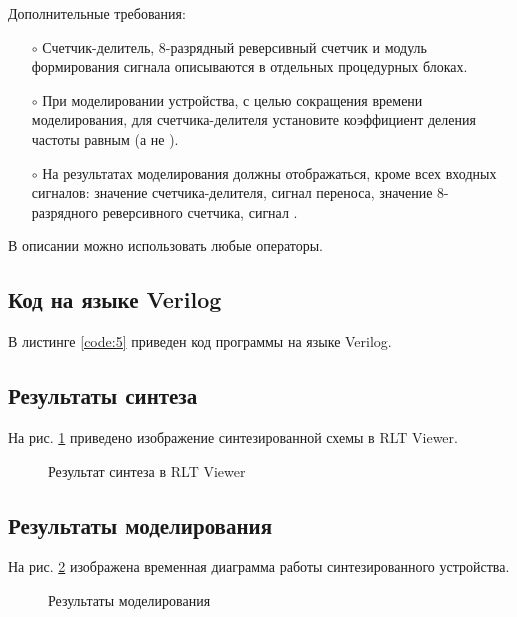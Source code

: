 Дополнительные требования:
\begin{itemize}
	\item[$\circ$] Счетчик-делитель, 8-разрядный реверсивный счетчик и модуль формирования сигнала  описываются в отдельных процедурных блоках.
	\item[$\circ$] При моделировании устройства, с целью сокращения времени моделирования, для счетчика-делителя установите коэффициент деления частоты равным  (а не ).
	\item[$\circ$] На результатах моделирования должны отображаться, кроме всех входных сигналов: значение счетчика-делителя, сигнал переноса, значение 8-разрядного реверсивного счетчика, сигнал .
\end{itemize}

В описании можно использовать любые операторы.

\subsection{Код на языке Verilog}

В листинге \ref{code:5} приведен код программы на языке Verilog.

%

\subsection{Результаты синтеза}

На рис. \ref{fig:elab4_1_rtl} приведено изображение синтезированной схемы в RLT Viewer.

\begin{figure}[H]
\begin{center}
	\caption{Результат синтеза в RLT Viewer}
	\label{fig:elab4_1_rtl}
\end{center}
\end{figure}

\subsection{Результаты моделирования}
\label{sec:elab4_1_modeling}

На рис. \ref{fig:elab4_1_modeling} изображена временная диаграмма работы синтезированного устройства. 

\begin{figure}[H]
\begin{center}
	\caption{Результаты моделирования}
	\label{fig:elab4_1_modeling}
\end{center}
\end{figure}

